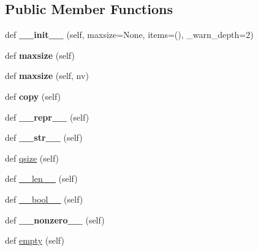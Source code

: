 \subsection*{Public Member Functions}
\begin{DoxyCompactItemize}
\item 
\mbox{\label{classgevent_1_1queue_1_1_queue_a451b7167f20d7474e7a0b7423cffcf34}} 
def {\bfseries \+\_\+\+\_\+init\+\_\+\+\_\+} (self, maxsize=None, items=(), \+\_\+warn\+\_\+depth=2)
\item 
\mbox{\label{classgevent_1_1queue_1_1_queue_aaeec0d774d6bd75872c7d5e265800806}} 
def {\bfseries maxsize} (self)
\item 
\mbox{\label{classgevent_1_1queue_1_1_queue_ac66adc6e2119e153be24d4032a0b9747}} 
def {\bfseries maxsize} (self, nv)
\item 
\mbox{\label{classgevent_1_1queue_1_1_queue_a70c350976e7cf60237bfe37f1bfef8d3}} 
def {\bfseries copy} (self)
\item 
\mbox{\label{classgevent_1_1queue_1_1_queue_a8bb4a45a6d0f23ee752e28167e5b288e}} 
def {\bfseries \+\_\+\+\_\+repr\+\_\+\+\_\+} (self)
\item 
\mbox{\label{classgevent_1_1queue_1_1_queue_a4c389d0ea2f87f4de71459ddf2e23b8c}} 
def {\bfseries \+\_\+\+\_\+str\+\_\+\+\_\+} (self)
\item 
def \hyperlink{classgevent_1_1queue_1_1_queue_a84c2f7fb732602fa1233026865a958df}{qsize} (self)
\item 
def \hyperlink{classgevent_1_1queue_1_1_queue_a1b2a3b67717cdb6fd8200c751d30d14a}{\+\_\+\+\_\+len\+\_\+\+\_\+} (self)
\item 
def \hyperlink{classgevent_1_1queue_1_1_queue_a43c38488ce8958ca9ae2b6117c1b22ed}{\+\_\+\+\_\+bool\+\_\+\+\_\+} (self)
\item 
\mbox{\label{classgevent_1_1queue_1_1_queue_a3fc76e29fd77d7261317560ff1566a4f}} 
def {\bfseries \+\_\+\+\_\+nonzero\+\_\+\+\_\+} (self)
\item 
def \hyperlink{classgevent_1_1queue_1_1_queue_a1534373d379168ae9408af6b632df285}{empty} (self)

\end{DoxyCompactItemize}
